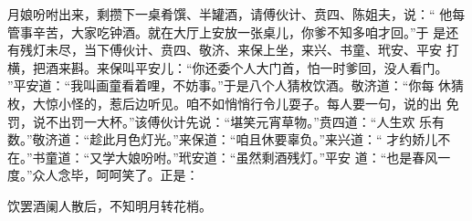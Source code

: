 月娘吩咐出来，剩攒下一桌肴馔、半罐酒，请傅伙计、贲四、陈姐夫，说：“
他每管事辛苦，大家吃钟酒。就在大厅上安放一张桌儿，你爹不知多咱才回。”于
是还有残灯未尽，当下傅伙计、贲四、敬济、来保上坐，来兴、书童、玳安、平安
打横，把酒来斟。来保叫平安儿：“你还委个人大门首，怕一时爹回，没人看门。
”平安道：“我叫画童看着哩，不妨事。”于是八个人猜枚饮酒。敬济道：“你每
休猜枚，大惊小怪的，惹后边听见。咱不如悄悄行令儿耍子。每人要一句，说的出
免罚，说不出罚一大杯。”该傅伙计先说：“堪笑元宵草物。”贲四道：“人生欢
乐有数。”敬济道：“趁此月色灯光。”来保道：“咱且休要辜负。”来兴道：“
才约娇儿不在。”书童道：“又学大娘吩咐。”玳安道：“虽然剩酒残灯。”平安
道：“也是春风一度。”众人念毕，呵呵笑了。正是：

饮罢酒阑人散后，不知明月转花梢。